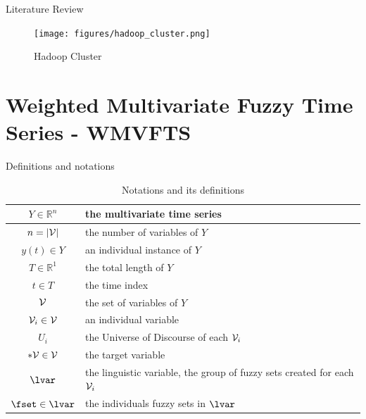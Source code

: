 \documentclass{beamer}
\begin{document}


\begin{frame}{Literature Review}

\begin{figure}
    \centering
    \texttt{[image: figures/hadoop\_cluster.png]}
    \caption{Hadoop Cluster}
    \label{fig:my_label}
\end{figure}

\end{frame}


\section{Weighted Multivariate Fuzzy Time Series - WMVFTS}

\begin{frame}{Definitions and notations}
\begin{table}[]
    \centering
    \begin{tabular}{|c|m{7cm}|} \hline
        $Y \in \mathbb{R}^n$ &  the multivariate time series \\ \hline
        $n = |\mathcal{V}|$ & the number of variables of $Y$  \\ \hline
        $y(t) \in Y$ & an individual instance of $Y$ \\ \hline
        $T \in \mathbb{R}^1$ & the total length of $Y$ \\ \hline
        $t \in T$ & the time index \\ \hline
        $\mathcal{V}$ & the set of variables of $Y$ \\ \hline
        $\mathcal{V}_i \in \mathcal{V}$ & an individual variable \\ \hline
        $U_i$ & the Universe of Discourse of each  $\mathcal{V}_i$ \\ \hline
        $*\mathcal{V} \in \mathcal{V}$ & the target variable \\ \hline
        $\lvar$ & the linguistic variable, the group of fuzzy sets created for each $\mathcal{V}_i$ \\ \hline
        $\fset \in \lvar$ & the individuals fuzzy sets in $\lvar$ \\ \hline
    \end{tabular}
    \caption{Notations and its definitions}
    \label{tab:my_label}
\end{table}
\end{frame}
\end{document}
